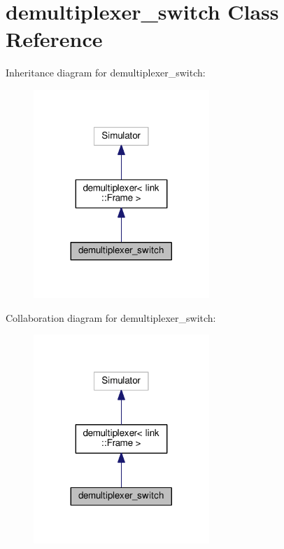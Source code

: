 \hypertarget{classdemultiplexer__switch}{}\section{demultiplexer\+\_\+switch Class Reference}
\label{classdemultiplexer__switch}


Inheritance diagram for demultiplexer\+\_\+switch\+:
\nopagebreak
\begin{figure}[H]
\begin{center}
\leavevmode
\includegraphics[width=188pt]{classdemultiplexer__switch__inherit__graph}
\end{center}
\end{figure}


Collaboration diagram for demultiplexer\+\_\+switch\+:
\nopagebreak
\begin{figure}[H]
\begin{center}
\leavevmode
\includegraphics[width=188pt]{classdemultiplexer__switch__coll__graph}
\end{center}
\end{figure}
